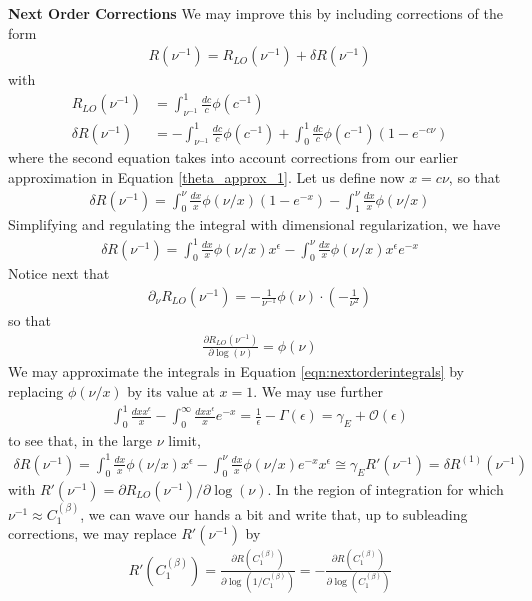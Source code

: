 \textbf{Next Order Corrections}
We may improve this by including corrections of the form
\begin{align}
    R(\nu^{-1}) = R_{LO}(\nu^{-1}) + \delta R(\nu^{-1})
\end{align}
with
\begin{align}
    R_{LO}(\nu^{-1}) &= \int_{\nu^{-1}}^1 \frac{dc}{c} \phi(c^{-1})
    \\
    \delta R(\nu^{-1}) &= -\int_{\nu^{-1}}^1 \frac{dc}{c} \phi(c^{-1}) + \int_0^1 \frac{dc}{c} \phi(c^{-1}) \left( 1 - e^{-c \nu} \right)
\end{align}
where the second equation takes into account corrections from our earlier approximation in Equation \ref{theta_approx_1}.
Let us define now \(x = c \nu\), so that
\begin{align}
    \delta R(\nu^{-1}) = \int_0^{\nu} \frac{dx}{x} \phi(\nu/x) \left( 1 - e^{-x}\right) - \int_1^\nu \frac{dx}{x} \phi(\nu/x)
\end{align}
Simplifying and regulating the integral with dimensional regularization, we have
\begin{align}
    \delta R(\nu^{-1}) = \int_0^{1} \frac{dx}{x} \phi(\nu/x) x^\epsilon - \int_0^\nu \frac{dx}{x} \phi(\nu/x) x^\epsilon e^{-x}
\end{align}
Notice next that
\begin{align}
    \partial_\nu R_{LO}(\nu^{-1}) =  -\frac{1}{\nu^{-1}} \phi(\nu) \cdot (-\frac{1}{\nu^2})
\end{align}
so that
\begin{align}
    \frac{\partial R_{LO}(\nu^{-1})}{\partial \log(\nu)} = \phi(\nu)
\end{align}
We may approximate the integrals in Equation \ref{eqn:nextorderintegrals} by replacing \(\phi(\nu/x)\) by its value at \(x = 1\). We may use further
\begin{align}
    \int_0^1\frac{dx x^\epsilon}{x} - \int_0^\infty\frac{dx x^\epsilon}{x}e^{-x} = \frac{1}{\epsilon} - \Gamma(\epsilon) = \gamma_E + \mathcal{O}(\epsilon)
\end{align}
to see that, in the large \(\nu\) limit,
\begin{align}
    \delta R(\nu^{-1}) = \int_0^{1} \frac{dx}{x} \phi(\nu/x) x^\epsilon - \int_0^\nu \frac{dx}{x} \phi(\nu/x) e^{-x} x^\epsilon \cong \gamma_E R'(\nu^{-1}) = \delta R^{(1)}(\nu^{-1})
\end{align}
with \(R'(\nu^{-1}) = \partial R_{LO}(\nu^{-1}) / \partial \log(\nu)\). In the region of integration for which \(\nu^{-1}\approx C_1^{(\beta)}\), we can wave our hands a bit and write that, up to subleading corrections, we may replace \(R'(\nu^{-1})\) by
\begin{align}
    R'(C_1^{(\beta)}) = \frac{\partial R (C_1^{(\beta)})}{\partial \log(1/C_1^{(\beta)})} = -\frac{\partial R (C_1^{(\beta)})}{\partial \log(C_1^{(\beta)})}
\end{align}

